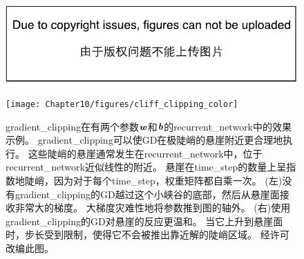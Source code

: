 \begin{figure}[!htb]
\ifOpenSource
\centerline{\includegraphics{figure.pdf}}
\else
\centerline{\texttt{[image: Chapter10/figures/cliff\_clipping\_color]}}
\fi
\caption{\gls{gradient_clipping}在有两个参数$\boldsymbol{\mathit{w}}$和$\boldsymbol{\mathit{b}}$的\gls{recurrent_network}中的效果示例。
\gls{gradient_clipping}可以使\gls{GD}在极陡峭的悬崖附近更合理地执行。
这些陡峭的悬崖通常发生在\gls{recurrent_network}中，位于\gls{recurrent_network}近似线性的附近。
悬崖在\gls{time_step}的数量上呈指数地陡峭，因为对于每个\gls{time_step}，权重矩阵都自乘一次。
(左)没有\gls{gradient_clipping}的\gls{GD}越过这个小峡谷的底部，然后从悬崖面接收非常大的梯度。
大梯度灾难性地将参数推到图的轴外。
(右)使用\gls{gradient_clipping}的\gls{GD}对悬崖的反应更温和。
当它上升到悬崖面时，步长受到限制，使得它不会被推出靠近解的陡峭区域。
经\citet{Pascanu+al-ICML2013-small}许可改编此图。
}
\label{fig:chap10_cliff_clipping_color}
\end{figure}


